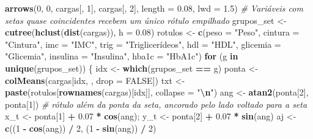 \documentclass[
]{book}
\newenvironment{Shaded}{\begin{snugshade}}{\end{snugshade}}
\newcommand{\AttributeTok}[1]{\textcolor[rgb]{0.13,0.29,0.53}{#1}}
\newcommand{\CommentTok}[1]{\textcolor[rgb]{0.56,0.35,0.01}{\textit{#1}}}
\newcommand{\ConstantTok}[1]{\textcolor[rgb]{0.56,0.35,0.01}{#1}}
\newcommand{\ControlFlowTok}[1]{\textcolor[rgb]{0.13,0.29,0.53}{\textbf{#1}}}
\newcommand{\DecValTok}[1]{\textcolor[rgb]{0.00,0.00,0.81}{#1}}
\newcommand{\FloatTok}[1]{\textcolor[rgb]{0.00,0.00,0.81}{#1}}
\newcommand{\FunctionTok}[1]{\textcolor[rgb]{0.13,0.29,0.53}{\textbf{#1}}}
\newcommand{\NormalTok}[1]{#1}
\newcommand{\OtherTok}[1]{\textcolor[rgb]{0.56,0.35,0.01}{#1}}
\newcommand{\SpecialCharTok}[1]{\textcolor[rgb]{0.81,0.36,0.00}{\textbf{#1}}}
\newcommand{\StringTok}[1]{\textcolor[rgb]{0.31,0.60,0.02}{#1}}
\begin{document}
\begin{Shaded}
\begin{Highlighting}[]
\FunctionTok{arrows}\NormalTok{(}\DecValTok{0}\NormalTok{, }\DecValTok{0}\NormalTok{, cargas[, }\DecValTok{1}\NormalTok{], cargas[, }\DecValTok{2}\NormalTok{], }\AttributeTok{length =} \FloatTok{0.08}\NormalTok{, }\AttributeTok{lwd =} \FloatTok{1.5}\NormalTok{)}
\CommentTok{\# Variáveis com setas quase coincidentes recebem um único rótulo empilhado}
\NormalTok{grupos\_set }\OtherTok{\textless{}{-}} \FunctionTok{cutree}\NormalTok{(}\FunctionTok{hclust}\NormalTok{(}\FunctionTok{dist}\NormalTok{(cargas)), }\AttributeTok{h =} \FloatTok{0.08}\NormalTok{)}
\NormalTok{rotulos }\OtherTok{\textless{}{-}} \FunctionTok{c}\NormalTok{(}\AttributeTok{peso =} \StringTok{"Peso"}\NormalTok{, }\AttributeTok{cintura =} \StringTok{"Cintura"}\NormalTok{, }\AttributeTok{imc =} \StringTok{"IMC"}\NormalTok{, }\AttributeTok{trig =} \StringTok{"Triglicerídeos"}\NormalTok{,}
             \AttributeTok{hdl =} \StringTok{"HDL"}\NormalTok{, }\AttributeTok{glicemia =} \StringTok{"Glicemia"}\NormalTok{, }\AttributeTok{insulina =} \StringTok{"Insulina"}\NormalTok{, }\AttributeTok{hba1c =} \StringTok{"HbA1c"}\NormalTok{)}
\ControlFlowTok{for}\NormalTok{ (g }\ControlFlowTok{in} \FunctionTok{unique}\NormalTok{(grupos\_set)) \{}
\NormalTok{  idx }\OtherTok{\textless{}{-}} \FunctionTok{which}\NormalTok{(grupos\_set }\SpecialCharTok{==}\NormalTok{ g)}
\NormalTok{  ponta }\OtherTok{\textless{}{-}} \FunctionTok{colMeans}\NormalTok{(cargas[idx, , }\AttributeTok{drop =} \ConstantTok{FALSE}\NormalTok{])}
\NormalTok{  txt }\OtherTok{\textless{}{-}} \FunctionTok{paste}\NormalTok{(rotulos[}\FunctionTok{rownames}\NormalTok{(cargas)[idx]], }\AttributeTok{collapse =} \StringTok{"}\SpecialCharTok{\textbackslash{}n}\StringTok{"}\NormalTok{)}
\NormalTok{  ang }\OtherTok{\textless{}{-}} \FunctionTok{atan2}\NormalTok{(ponta[}\DecValTok{2}\NormalTok{], ponta[}\DecValTok{1}\NormalTok{])}
  \CommentTok{\# rótulo além da ponta da seta, ancorado pelo lado voltado para a seta}
\NormalTok{  x\_t }\OtherTok{\textless{}{-}}\NormalTok{ ponta[}\DecValTok{1}\NormalTok{] }\SpecialCharTok{+} \FloatTok{0.07} \SpecialCharTok{*} \FunctionTok{cos}\NormalTok{(ang); y\_t }\OtherTok{\textless{}{-}}\NormalTok{ ponta[}\DecValTok{2}\NormalTok{] }\SpecialCharTok{+} \FloatTok{0.07} \SpecialCharTok{*} \FunctionTok{sin}\NormalTok{(ang)}
\NormalTok{  aj }\OtherTok{\textless{}{-}} \FunctionTok{c}\NormalTok{((}\DecValTok{1} \SpecialCharTok{{-}} \FunctionTok{cos}\NormalTok{(ang)) }\SpecialCharTok{/} \DecValTok{2}\NormalTok{, (}\DecValTok{1} \SpecialCharTok{{-}} \FunctionTok{sin}\NormalTok{(ang)) }\SpecialCharTok{/} \DecValTok{2}\NormalTok{)}

\end{Highlighting}
\end{Shaded}
\end{document}
